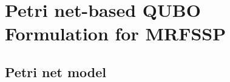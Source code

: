 \documentclass[conference]{IEEEtran}
\begin{document}
%
%
%
%



\section{Petri net-based QUBO Formulation for MRFSSP}

\subsection{Petri net model}
\end{document}
